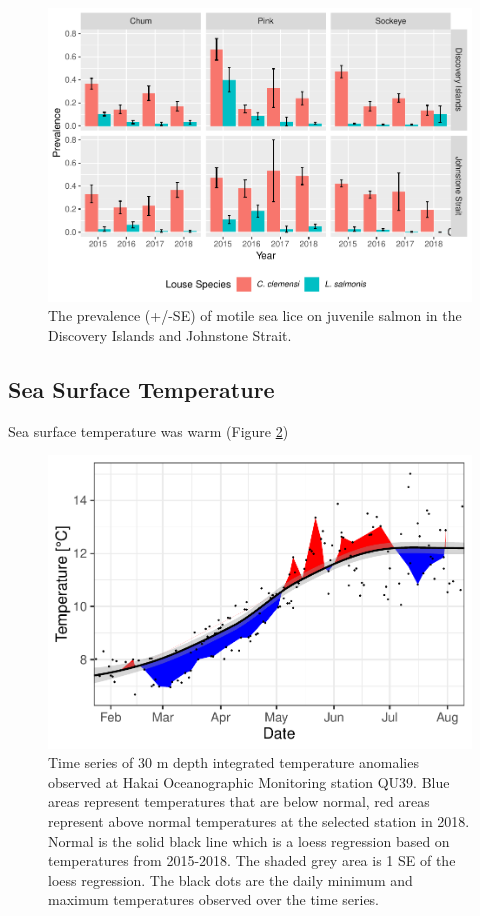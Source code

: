 \documentclass[fleqn,10pt]{wlpeerj} %
\begin{document}
\begin{figure}
\includegraphics[width=0.8\linewidth]{peer_j_migration_dynamics_files/figure-latex/sealice-1} \caption{The prevalence (+/-SE) of motile sea lice on juvenile salmon in the Discovery Islands and Johnstone Strait.}\label{fig:sealice}
\end{figure}

\subsection*{Sea Surface Temperature}\label{sea-surface-temperature}

Sea surface temperature was warm (Figure \ref{fig:sst})

\begin{figure}
\includegraphics[width=0.8\linewidth]{peer_j_migration_dynamics_files/figure-latex/sst-1} \caption{Time series of 30 m depth integrated temperature anomalies observed at Hakai Oceanographic Monitoring station QU39. Blue areas represent temperatures that are below normal, red areas represent above normal temperatures at the selected station in 2018. Normal is the solid black line which is a loess regression based on temperatures from 2015-2018. The shaded grey area is 1 SE of the loess regression. The black dots are the daily minimum and maximum temperatures observed over the time series.}\label{fig:sst}
\end{figure}
\end{document}
